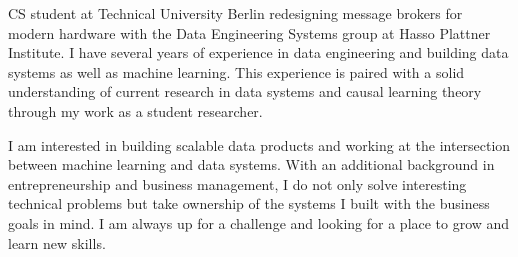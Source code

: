

\begin{cvparagraph}

CS student at Technical University Berlin redesigning message brokers for modern hardware with the Data Engineering Systems group at Hasso Plattner Institute. I have several years of experience in data engineering and building data systems as well as machine learning. This experience is paired with a solid understanding of current research in data systems and causal learning theory through my work as a student researcher.

I am interested in building scalable data products and working at the intersection between machine learning and data systems. With an additional background in entrepreneurship and business management, I do not only solve interesting technical problems but take ownership of the systems I built with the business goals in mind. I am always up for a challenge and looking for a place to grow and learn new skills.
\end{cvparagraph}
